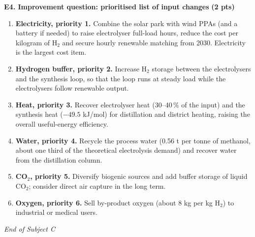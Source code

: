 \documentclass[11pt,a4paper]{article}
\newcommand{\pts}[1]{\hfill{\normalsize\textbf{(#1)}}}
\begin{document}
\textbf{E4. Improvement question: prioritised list of input changes} \pts{2 pts}
\begin{enumerate}
  \item \textbf{Electricity, priority 1.} Combine the solar park with wind PPAs (and a battery if needed) to raise
        electrolyser full-load hours, reduce the cost per kilogram of H$_2$ and secure hourly renewable matching from
        2030. Electricity is the largest cost item.
  \item \textbf{Hydrogen buffer, priority 2.} Increase H$_2$ storage between the electrolysers and the synthesis loop,
        so that the loop runs at steady load while the electrolysers follow renewable output.
  \item \textbf{Heat, priority 3.} Recover electrolyser heat (30--40\,\% of the input) and the synthesis heat
        ($-49.5$ kJ/mol) for distillation and district heating, raising the overall useful-energy efficiency.
  \item \textbf{Water, priority 4.} Recycle the process water (0.56 t per tonne of methanol, about one third of the
        theoretical electrolysis demand) and recover water from the distillation column.
  \item \textbf{CO$_2$, priority 5.} Diversify biogenic sources and add buffer storage of liquid CO$_2$; consider
        direct air capture in the long term.
  \item \textbf{Oxygen, priority 6.} Sell by-product oxygen (about 8 kg per kg H$_2$) to industrial or medical users.
\end{enumerate}

\begin{center}\textit{End of Subject C}\end{center}

\clearpage
\end{document}
